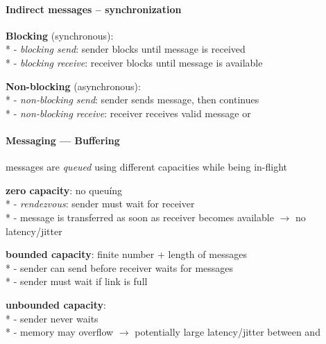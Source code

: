 \paragraph{Indirect messages -- synchronization}
\begin{items}
  \item \textbf{Blocking} (synchronous): \\*
    - \emph{blocking send}: sender blocks until message is received \\*
    - \emph{blocking receive}: receiver blocks until message is available
  \item \textbf{Non-blocking} (asynchronous): \\*
    - \emph{non-blocking send}: sender sends message, then continues \\*
    - \emph{non-blocking receive}: receiver receives valid message or 
\end{items}

\paragraph{Messaging --- Buffering}
\begin{items}
  \item messages are \emph{queued} using different capacities while being in-flight
  \item \textbf{zero capacity}: no queuíng \\*
    - \emph{rendezvous}: sender must wait for receiver \\*
    - message is transferred as soon as receiver becomes available \( \to \) no latency/jitter
  \item \textbf{bounded capacity}: finite number + length of messages \\*
    - sender can send before receiver waits for messages \\*
    - sender must wait if link is full
  \item \textbf{unbounded capacity}: \\*
    - sender never waits \\*
    - memory may overflow \( \to \) potentially large latency/jitter between  and 
\end{items}

